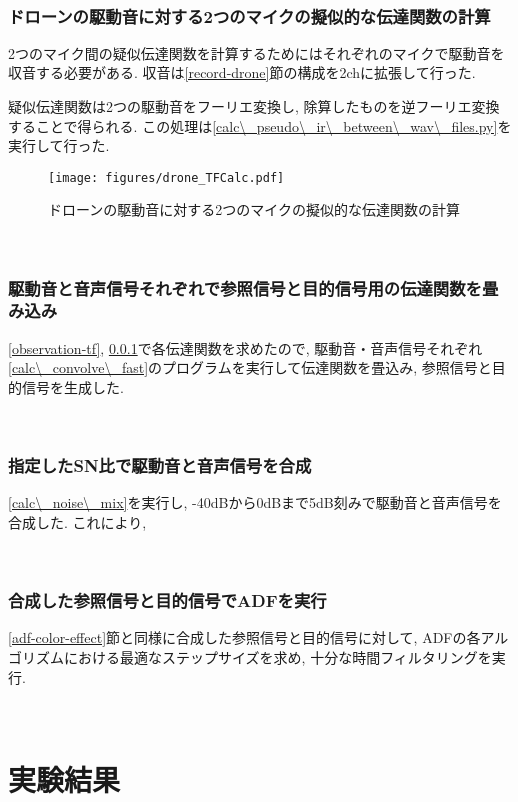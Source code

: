 \
\subsubsection{ドローンの駆動音に対する2つのマイクの擬似的な伝達関数の計算}\label{pseudo-tf}

2つのマイク間の疑似伝達関数を計算するためにはそれぞれのマイクで駆動音を収音する必要がある. 収音は\ref{record-drone}節の構成を2chに拡張して行った. 

疑似伝達関数は2つの駆動音をフーリエ変換し, 除算したものを逆フーリエ変換することで得られる. この処理は\ref{calc\_pseudo\_ir\_between\_wav\_files.py}を実行して行った. 

\begin{figure}[H]
\centering
\texttt{[image: figures/drone\_TFCalc.pdf]}
\caption{ドローンの駆動音に対する2つのマイクの擬似的な伝達関数の計算}
\end{figure}

\
\subsubsection{駆動音と音声信号それぞれで参照信号と目的信号用の伝達関数を畳み込み}\label{convolve-each}

\ref{observation-tf}, \ref{pseudo-tf}で各伝達関数を求めたので, 駆動音・音声信号それぞれ\ref{calc\_convolve\_fast}のプログラムを実行して伝達関数を畳込み, 参照信号と目的信号を生成した. 

\
\subsubsection{指定したSN比で駆動音と音声信号を合成}\label{mix-snr}

\ref{calc\_noise\_mix}を実行し, -40dBから0dBまで5dB刻みで駆動音と音声信号を合成した. これにより, 

\
\subsubsection{合成した参照信号と目的信号でADFを実行}\label{exec-adf}

\ref{adf-color-effect}節と同様に合成した参照信号と目的信号に対して, ADFの各アルゴリズムにおける最適なステップサイズを求め, 十分な時間フィルタリングを実行. 

\
\section{実験結果}\label{result-practice}

